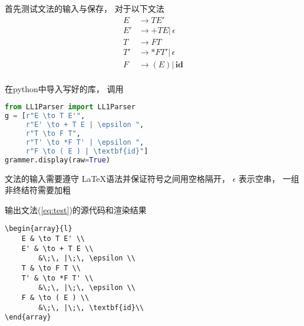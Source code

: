 \documentclass[../report]{subfiles}
\begin{document}
首先测试文法的输入与保存，
对于以下文法
\begin{equation}
  \begin{array}{ll}
		E & \to T E' \\
		E' & \to + T E |\, \epsilon \\
		T & \to F T \\
		T' & \to *F T' |\, \epsilon \\
		F & \to ( E ) |\, \textbf{id}\\
  \end{array}
  \label{eq:test}
\end{equation}

在python中导入写好的库，
调用
\begin{lstlisting}[language=python]
from LL1Parser import LL1Parser
g = [r"E \to T E'",
     r"E' \to + T E | \epsilon ",
     r"T \to F T",
     r"T' \to *F T' | \epsilon ",
     r"F \to ( E ) | \textbf{id}"]
grammer.display(raw=True)
\end{lstlisting}
文法的输入需要遵守 \LaTeX 语法并保证符号之间用空格隔开，
$\epsilon$ 表示空串，
一组非终结符需要加粗

输出文法(\ref{eq:test})的源代码和渲染结果
\begin{lstlisting}
\begin{array}{l}
	E & \to T E' \\
	E' & \to + T E \\
		&\;\, |\;\, \epsilon \\
	T & \to F T \\
	T' & \to *F T' \\
		&\;\, |\;\, \epsilon \\
	F & \to ( E ) \\
		&\;\, |\;\, \textbf{id}\\
\end{array}
\end{lstlisting}
\end{document}
